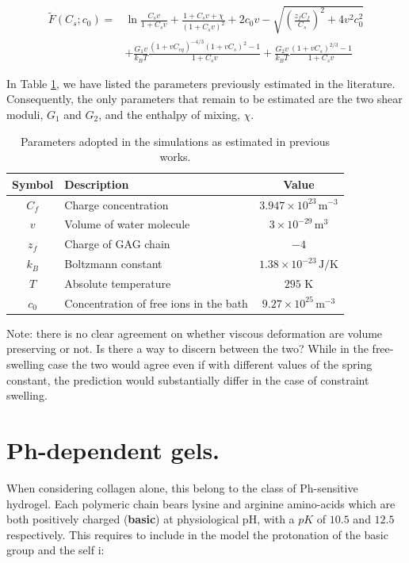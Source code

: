 \documentclass[12pt]{extarticle}
\begin{document}
\begin{equation*}
\begin{aligned}
\tilde{F}(C_s; c_0) =  &\ln \frac{C_sv}{1+C_sv} +\frac{1+C_sv+\chi}{(1+C_sv)^2}+2c_0v-\sqrt{\left(\frac{z_fC_f}{C_s}\right)^2+4v^2c^2_0} \\[1.5mm]
&+\frac{G_1v}{k_BT} \frac{(1+vC_{eq})^{-4/3}(1+vC_s)^2-1}{1+C_sv}+ \frac{G_2v}{k_BT} \frac{(1+vC_s)^{2/3}-1}{1+C_sv}
\end{aligned}
\end{equation*}

In Table \ref{Tab1}, we have listed the parameters previously estimated in the literature. Consequently, the only parameters that remain to be estimated are the two shear moduli, $G_1$ and $G_2$, and the enthalpy of mixing, $\chi$.
\begin{table}
	\begin{tabular}{c l c}
		\hline\addlinespace[2pt]
		Symbol & Description & Value\\
		\hline\addlinespace[5pt]
		$C_f$ & Charge concentration & $3.947\times 10^{23} \, \text{m}^{-3}$\\
		$v$ & Volume of water molecule & $3\times 10^{-29} \, \text{m}^3$ \\
		$z_f$ & Charge of GAG chain & $-4$\\
		$k_B$ & Boltzmann constant & $1.38 \times 10^{-23}\, \text{J}/\text{K}$\\
		$T$ & Absolute temperature &$295$ K\\
		$c_0$ & Concentration of free ions in the bath & $9.27\times 10^{25}\, \text{m}^{-3}$\\
		\hline
	\end{tabular}
\caption{Parameters adopted in the simulations as estimated in previous works.}
\label{Tab1}
\end{table}

Note: there is no clear agreement on whether viscous deformation are volume preserving or not. Is there a way to discern between the two?  While in the free-swelling case the two would agree even  if with different values of the spring constant, the prediction would substantially differ in the case of constraint swelling.
\section{Ph-dependent gels.}
When considering collagen alone, this belong to the class of Ph-sensitive hydrogel. Each polymeric chain bears lysine and arginine amino-acids which are both positively charged (\textbf{basic}) at physiological pH, with a $pK$ of $10.5$ and $12.5$ respectively. This requires to include in the model the protonation of the basic group and the self i:
\end{document}

